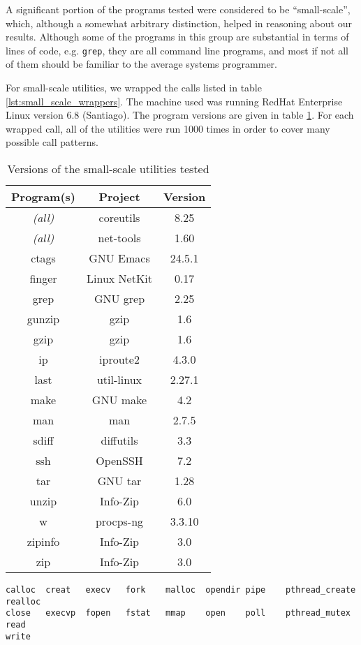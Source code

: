 A significant portion of the programs tested were considered to be ``small-scale'', which, although a somewhat arbitrary distinction, helped in reasoning about our results. Although some of the programs in this group are substantial in terms of lines of code, e.g. \texttt{grep}, they are all command line programs, and most if not all of them should be familiar to the average systems programmer.

For small-scale utilities, we wrapped the calls listed in table \ref{lst:small_scale_wrappers}. The machine used was running RedHat Enterprise Linux version 6.8 (Santiago). The program versions are given in table \ref{tab:small_scale_versions}. For each wrapped call, all of the utilities were run 1000 times in order to cover many possible call patterns.

\begin{table}[h!]
\begin{center}
\begin{tabular}{ |c|c|c| }
\hline
\multicolumn{1}{|c|}{\textbf{Program(s)}} & \multicolumn{1}{|c|}{\textbf{Project}} & \multicolumn{1}{c|}{\textbf{Version}} \\
\hline
\em{(all)} & coreutils  & 8.25 \\ 
\hline
\em{(all)} & net-tools & 1.60 \\
\hline
ctags&GNU Emacs & 24.5.1 \\
finger&Linux NetKit  & 0.17 \\
grep & GNU grep & 2.25 \\
gunzip & gzip & 1.6 \\
gzip & gzip & 1.6 \\
ip&iproute2 & 4.3.0 \\
last & util-linux & 2.27.1 \\
make & GNU make & 4.2 \\
man & man & 2.7.5 \\
sdiff&diffutils & 3.3 \\
ssh&OpenSSH & 7.2 \\
tar&GNU tar & 1.28 \\
unzip&Info-Zip  & 6.0 \\
w&procps-ng & 3.3.10 \\
zipinfo&Info-Zip & 3.0 \\
zip&Info-Zip & 3.0 \\
\hline
\end{tabular}
\caption{Versions of the small-scale utilities tested}
\label{tab:small_scale_versions}
\end{center}
\end{table}

\PreTable
\begin{lstlisting}[captionpos=b, label={lst:small_scale_wrappers},caption={Wrapped calls for testing small-scale utilities}]
calloc  creat   execv   fork    malloc  opendir pipe    pthread_create 	realloc
close   execvp  fopen   fstat   mmap    open    poll    pthread_mutex	read    
write
\end{lstlisting}
\PostTable
